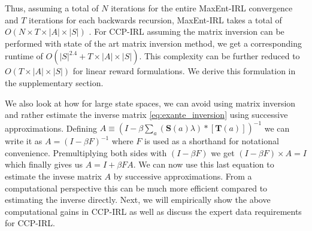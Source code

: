 \documentclass{article}
\begin{document}
Thus, assuming a total of $N$ iterations for the entire MaxEnt-IRL convergence and $T$ iterations for each backwards recursion, MaxEnt-IRL takes a total of $O(N\times T \times|A|\times|S|)$ \cite{ziebart_phd}. For CCP-IRL assuming the matrix inversion can be performed with state of the art matrix inversion method, we get a corresponding runtime of $O(|S|^{2.4}+T\times|A|\times|S|)$. This complexity can be further reduced to $O(T\times|A|\times|S|)$ for linear reward formulations. We derive this formulation in the supplementary section.

We also look at how for large state spaces, we can avoid using matrix inversion and rather estimate the inverse matrix \eqref{eq:exante_inversion} using successive approximations.
Defining $A \equiv \left(I- \beta \sum_{a}(\mathbf{S}(a) \lambda) *\left[ \mathbf{T}(a)  \right]\right)^{-1}$ we can write it as $A = (I - \beta F)^{-1}$ where $F$ is used as a shorthand for notational convenience. Premultiplying both sides with $(I - \beta F)$ we get $(I - \beta F)\times A = I$ which finally gives us $A = I + \beta F A$. We can now use this last equation to estimate the invese matrix $A$ by successive approximations. From a computational perspective this can be much more efficient compared to estimating the inverse directly. Next, we will empirically show the above computational gains in CCP-IRL as well as discuss the expert data requirements for CCP-IRL.


\end{document}
